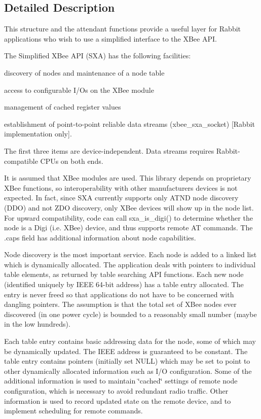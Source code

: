 \subsection{Detailed Description}
This structure and the attendant functions provide a useful layer for Rabbit applications who wish to use a simplified interface to the X\+Bee A\+PI. 

The Simplified X\+Bee A\+PI (S\+XA) has the following facilities\+:
\begin{DoxyItemize}
\item discovery of nodes and maintenance of a node table
\item access to configurable I/\+Os on the X\+Bee module
\item management of cached register values
\item establishment of point-\/to-\/point reliable data streams (xbee\+\_\+sxa\+\_\+socket) \mbox{[}Rabbit implementation only\mbox{]}.
\end{DoxyItemize}

The first three items are device-\/independent. Data streams requires Rabbit-\/compatible C\+P\+Us on both ends.

It is assumed that X\+Bee modules are used. This library depends on proprietary X\+Bee functions, so interoperability with other manufacturers\textquotesingle{} devices is not expected. In fact, since S\+XA currently supports only A\+T\+ND node discovery (D\+DO) and not Z\+DO discovery, only X\+Bee devices will show up in the node list. For upward compatibility, code can call sxa\+\_\+is\+\_\+digi() to determine whether the node is a \textquotesingle{}Digi\textquotesingle{} (i.\+e. X\+Bee) device, and thus supports remote AT commands. The .caps field has additional information about node capabilities.

Node discovery is the most important service. Each node is added to a linked list which is dynamically allocated. The application deals with pointers to individual table elements, as returned by table searching A\+PI functions. Each new node (identified uniquely by I\+E\+EE 64-\/bit address) has a table entry allocated. The entry is never freed so that applications do not have to be concerned with dangling pointers. The assumption is that the total set of X\+Bee nodes ever discovered (in one power cycle) is bounded to a reasonably small number (maybe in the low hundreds).

Each table entry contains basic addressing data for the node, some of which may be dynamically updated. The I\+E\+EE address is guaranteed to be constant. The table entry contains pointers (initially set N\+U\+LL) which may be set to point to other dynamically allocated information such as I/O configuration. Some of the additional information is used to maintain \char`\"{}cached\char`\"{} settings of remote node configuration, which is necessary to avoid redundant radio traffic. Other information is used to record updated state on the remote device, and to implement scheduling for remote commands. 

